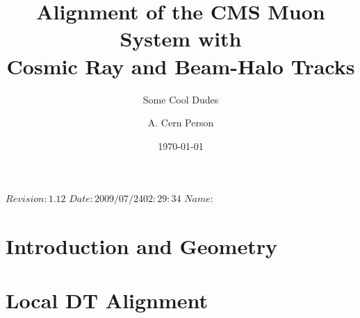 \RCS$Revision: 1.12 $
\RCS$Date: 2009/07/24 02:29:34 $
\RCS$Name:  $

\title{Alignment of the CMS Muon System with \\ Cosmic Ray and Beam-Halo Tracks}%

\address[cern]{CERN}
\address[su]{Some University}
\author[su]{Some Cool Dudes}\author[cern]{A. Cern Person}

\date{\today}

\abstract{

}


\maketitle %

\tableofcontents

\section{Introduction and Geometry}


\section{Local DT Alignment}
\label{sec:localdt}


